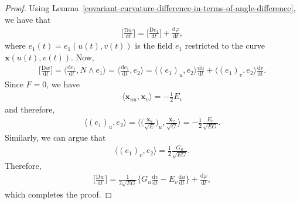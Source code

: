 \documentclass[10pt]{article}
\newcommand{\dee}{\mathrm{d}}
\newcommand{\Dee}{\mathrm{D}}
\newcommand{\ve}[1]{\mathbf{#1}}
\begin{document}
\begin{itemize}
\begin{proof}
      Using Lemma~\ref{covariant-curvature-difference-in-terms-of-angle-difference}, we have that
      \begin{align*}
        \bigg[ \frac{\Dee w}{\dee t} \bigg] = \bigg[ \frac{\Dee e_1}{\dee t} \bigg] + \frac{\dee \varphi}{\dee t},
      \end{align*}
      where $e_1(t) = e_1(u(t), v(t))$ is the field $e_1$ restricted to the curve $\ve{x}(u(t), v(t))$. Now,
      \begin{align*}
        \bigg[ \frac{\Dee w}{\dee t} \bigg] 
        = \bigg\langle \frac{\dee e_1}{\dee t}, N \wedge e_1 \bigg\rangle 
        = \bigg\langle \frac{\dee e_1}{\dee t}, e_2 \bigg\rangle 
        = \langle (e_1)_u, e_2 \rangle \frac{\dee u}{\dee t} + \langle (e_1)_v, e_2 \rangle \frac{\dee v}{\dee t}.
      \end{align*}
      Since $F = 0$, we have
      \begin{align*}
        \langle \ve{x}_{uu}, \ve{x}_v \rangle = -\frac{1}{2}E_v
      \end{align*}
      and therefore,
      \begin{align*}
        \langle (e_1)_u, e_2 \rangle = \bigg\langle \bigg( \frac{\ve{x}_u}{\sqrt{E}} \bigg)_u, \frac{\ve{x}_v}{\sqrt{G}} \bigg\rangle = -\frac{1}{2} \frac{E_v}{\sqrt{EG}}.
      \end{align*}
      Similarly, we can argue that
      \begin{align*}
        \langle (e_1)_v, e_2 \rangle = \frac{1}{2} \frac{G_u}{\sqrt{EG}}.
      \end{align*}
      Therefore,
      \begin{align*}
        \bigg[ \frac{\Dee w}{\dee t} \bigg]
        = \frac{1}{2\sqrt{EG}} \bigg\{ G_u \frac{\dee v}{\dee t} - E_v \frac{\dee u}{\dee t}\bigg\} + \frac{\dee \varphi}{\dee t},
      \end{align*}
      which completes the proof.
    \end{proof}


\end{itemize}
\end{document}
